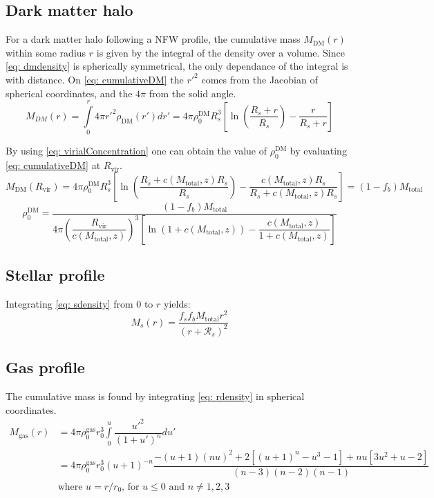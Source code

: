 	\subsection{Dark matter halo}
		For a dark matter halo following a NFW profile, the cumulative mass $M_\text{DM}(r)$ within some radius $r$ is given by the integral of the density over a volume. Since \autoref{eq: dmdensity} is spherically symmetrical, the only dependance of the integral is with distance. On \autoref{eq: cumulativeDM} the $r'^2$ comes from the Jacobian of spherical coordinates, and the $4\pi$ from the solid angle.
		\begin{equation}\label{eq: cumulativeDM}
			M_{DM}(r) = \int\limits_0^{r} 4\pi {r'}^2\rho_\text{DM}(r')dr' = 4\pi\rho_0^\text{DM}R_s^3\left[\ln\left(\dfrac{R_s + r}{R_s}\right) - \dfrac{r}{R_s + r}\right]
		\end{equation}
		
		By using \autoref{eq: virialConcentration} one can obtain the value of $\rho_0^\text{DM}$ by evaluating \autoref{eq: cumulativeDM} at $R_\text{vir}$.
		\begin{equation}\label{eq: dmM_virial}
		M_\text{DM}(R_\text{vir}) = 4\pi\rho_0^\text{DM}R_s^3 \left[\ln\left(\dfrac{R_s + c(M_\text{total}, z)R_s}{R_s}\right) - \dfrac{c(M_\text{total}, z)R_s}{R_s + c(M_\text{total}, z)R_s}\right] = (1 - f_b)M_\text{total}
		\end{equation}
		\begin{equation}\label{eq: rho0dm}
		\rho_0^\text{DM} = \dfrac{(1 - f_b)M_\text{total}}{4\pi \left(\dfrac{R_\text{vir}}{c(M_\text{total}, z)}\right)^3 \left[\ln\left(1 + c(M_\text{total}, z)\right) - \dfrac{c(M_\text{total}, z)}{1 + c(M_\text{total}, z)}\right]}
		\end{equation}
	
	\subsection{Stellar profile}		
		Integrating \autoref{eq: sdensity} from $0$ to $r$ yields:
		\begin{equation}
			M_s(r) = \dfrac{f_sf_bM_\text{total} r^2}{(r + \mathcal{R}_s)^2}
		\end{equation}
	
	\subsection{Gas profile}		
		The cumulative mass is found by integrating \autoref{eq: rdensity} in spherical coordinates.
		\begin{equation}
			\begin{array}{rl}
			M_\text{gas}(r) 
			& = 4\pi\rho_0^\text{gas} r_0^3\int\limits_{0}^{u}\dfrac{u'^2}{(1 + u')^n}du' \\
			& = 4\pi\rho_0^\text{gas} r_0^3\left(u + 1\right)^{-n}\dfrac{-(u + 1)(nu)^2 + 2[(u + 1)^n - u^3-1] + nu[3u^2 + u - 2]}{(n - 3)(n - 2)(n - 1)}
			\\
			& \text{where $u = r/r_0$, for $u \leq 0$ and $n \neq {1, 2, 3}$}
			\end{array}
		\end{equation}
		
